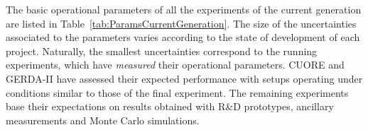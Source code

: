 \documentclass{PoS}
\begin{document}
The basic operational parameters of all the experiments of the current generation are listed in Table~\ref{tab:ParamsCurrentGeneration}. The size of the uncertainties associated to the parameters varies according to the state of development of each project.  Naturally, the smallest uncertainties correspond to the running experiments, which have \emph{measured} their operational parameters. CUORE and GERDA-II have assessed their expected performance with setups operating under conditions similar to those of the final experiment. The remaining experiments base their expectations on results obtained with R\&D prototypes, ancillary measurements and Monte Carlo simulations. 

\end{document}
